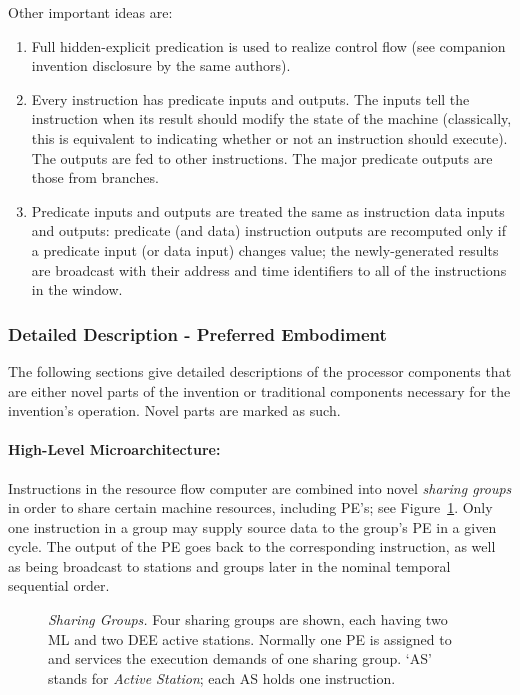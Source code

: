 \documentclass[10pt,dvips]{article}
\begin{document}
Other important ideas are:
\begin{enumerate}
\item Full hidden-explicit predication is used to realize control flow (see
companion invention disclosure by the same authors).

\item Every instruction has predicate inputs and outputs. The inputs tell the
instruction when its result should modify the state of the machine (classically,
this is equivalent to indicating whether or not an instruction should execute).
The outputs are fed to other instructions. The major predicate outputs are those
from branches.

\item Predicate inputs and outputs are treated the same as instruction data
inputs and outputs: predicate (and data) instruction outputs
are recomputed only if a predicate input (or data input) changes value; the
newly-generated results are broadcast with their address and time identifiers
to all of the instructions in the window.
\end{enumerate}

\subsubsection{Detailed Description - Preferred Embodiment}
The following sections give detailed descriptions of the processor components that
are either novel parts of the invention or traditional components
necessary for the invention's operation. Novel parts are marked as such.

\paragraph{High-Level Microarchitecture: }
Instructions in the resource flow computer are combined into novel {\it sharing groups}
in order to
share certain machine resources, including PE's; see Figure~\ref{sharinggroups}.
Only one instruction in a group may supply source data
to the group's PE in a given cycle.
The output of the PE goes back to the corresponding instruction,
as well as being broadcast to stations and
groups later in the nominal temporal sequential order.

\begin{figure}
\centering
{}
\caption{{\em Sharing Groups.} Four sharing groups are shown, each having two ML
and two DEE active stations. Normally one PE is assigned to and services the
execution demands of one sharing group. `AS' stands for {\it Active Station}; each
AS holds one instruction.}
\label{sharinggroups}
\end{figure}
\end{document}
